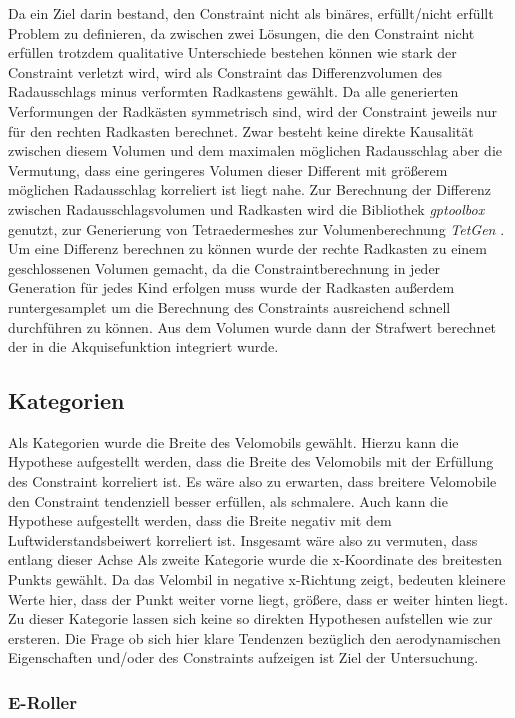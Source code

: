 Da ein Ziel darin bestand, den Constraint nicht als binäres, erfüllt/nicht erfüllt Problem zu definieren, da zwischen zwei Lösungen, die den Constraint nicht erfüllen trotzdem qualitative Unterschiede bestehen können wie stark der Constraint verletzt wird, wird als Constraint das Differenzvolumen des Radausschlags minus verformten Radkastens gewählt.
Da alle generierten Verformungen der Radkästen symmetrisch sind, wird der Constraint jeweils nur für den rechten Radkasten berechnet.
Zwar besteht keine direkte Kausalität zwischen diesem Volumen und dem maximalen möglichen Radausschlag aber die Vermutung, dass eine geringeres Volumen dieser Different mit größerem möglichen Radausschlag korreliert ist liegt nahe.
Zur Berechnung der Differenz zwischen Radausschlagsvolumen und Radkasten wird die Bibliothek \textit{gptoolbox}  genutzt, zur Generierung von Tetraedermeshes zur Volumenberechnung \textit{TetGen} .
Um eine Differenz berechnen zu können wurde der rechte Radkasten zu einem geschlossenen Volumen gemacht, da die Constraintberechnung in jeder Generation für jedes Kind erfolgen muss wurde der Radkasten außerdem runtergesamplet  um die Berechnung  des Constraints ausreichend schnell durchführen zu können.
Aus dem Volumen wurde dann der Strafwert berechnet der in die Akquisefunktion integriert wurde.

\subsection{Kategorien}
Als Kategorien wurde die Breite des Velomobils gewählt.
Hierzu kann die Hypothese aufgestellt werden, dass die Breite des Velomobils mit der Erfüllung des Constraint korreliert ist. Es wäre also zu erwarten, dass breitere Velomobile den Constraint tendenziell besser erfüllen, als schmalere.
Auch kann die Hypothese aufgestellt werden, dass die Breite negativ mit dem Luftwiderstandsbeiwert korreliert ist.
Insgesamt wäre also zu vermuten, dass entlang dieser Achse
Als zweite Kategorie wurde die x-Koordinate des breitesten Punkts gewählt.
Da das Velombil in negative x-Richtung zeigt, bedeuten kleinere Werte hier, dass der Punkt weiter vorne liegt, größere, dass er weiter hinten liegt.
Zu dieser Kategorie lassen sich keine so direkten Hypothesen aufstellen wie zur ersteren.
Die Frage ob sich hier klare Tendenzen bezüglich den aerodynamischen Eigenschaften und/oder des Constraints aufzeigen ist Ziel der Untersuchung.


\subsubsection{E-Roller}

